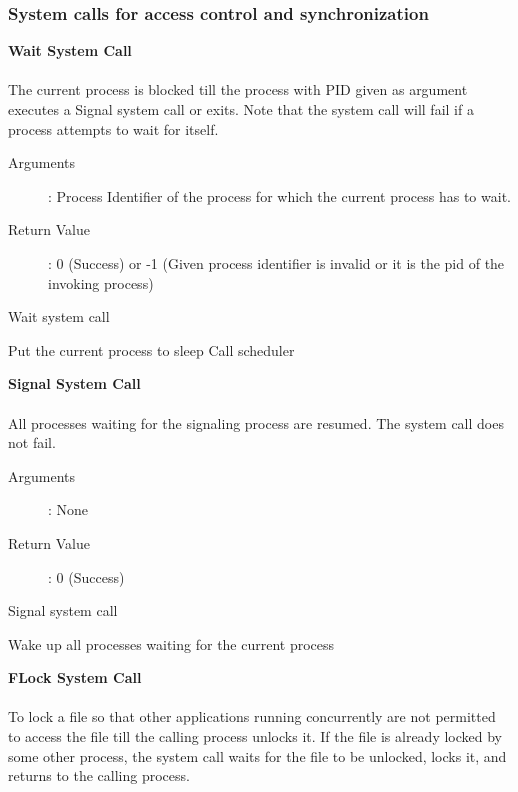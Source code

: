 \documentclass[10pt]{article}
\begin{document}
\subsubsection{System calls for access control and synchronization}
\textbf{Wait System Call}
\\ \\
The current process is blocked till the process with PID given as argument executes a Signal system call or exits. Note that the system call will fail if a process attempts to wait for itself.  
\begin{description}
\item[Arguments]: Process Identifier of the process for which the current process has to wait.
\item[Return Value]: 0 (Success) or -1 (Given process identifier is invalid or it is the pid of the invoking process)
\end{description} 
\begin{algorithm}
\caption{Wait system call}
\begin{algorithmic}
\ENDIF
\STATE Put the current process to sleep
\STATE Call scheduler
\end{algorithmic}
\end{algorithm}
\textbf{Signal System Call}
\\ \\
All processes waiting for the signaling process are resumed. The system call does not fail.
\begin{description}
\item[Arguments]: None
\item[Return Value]: 0 (Success) 
\end{description}
\begin{algorithm}
\caption{Signal system call}
\begin{algorithmic}
\STATE Wake up all processes waiting for the current process
\RETURN
\end{algorithmic}
\end{algorithm}
\vspace{8mm}
\textbf{FLock System Call}
\\ \\
To lock a file so that other applications running concurrently are not permitted to access the file till the calling process unlocks it. If the file is already locked by some other process, the system call waits for the file to be unlocked, locks it, and returns to the calling process.   
\end{document}
